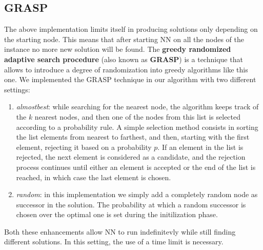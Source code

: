 \subsection{GRASP}
The above implementation limits itself in producing solutions only depending on the starting node.
This means that after starting NN on all the nodes of the instance no more new solution will be found.
The \textbf{greedy randomized adaptive search procedure} (also known as \textbf{GRASP}) is a technique that allows to introduce a degree of randomization into greedy algorithms like this one.
We implemented the GRASP technique in our algorithm with two different settings:
\begin{enumerate}
    \item \textit{almostbest}: 
    while searching for the nearest node, the algorithm keeps track of the $k$ nearest nodes, and then one of the nodes from this list is selected according to a probability rule.
    A simple selection method consists in sorting the list elements from nearest to farthest, and then, starting with the first element, rejecting it based on a probability $p$.
    If an element in the list is rejected, the next element is considered as a candidate, and the rejection process continues until either an element is accepted or the end of the list is reached, in which case the last element is chosen.
    \item \textit{random}:
    in this implementation we simply add a completely random node as successor in the solution.
    The probability at which a random successor is chosen over the optimal one is set during the initilization phase.
\end{enumerate}
Both these enhancements allow NN to run indefinitevly while still finding different solutions.
In this setting, the use of a time limit is necessary.


